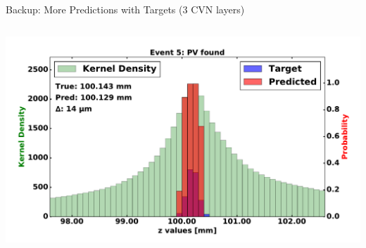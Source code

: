 \begin{frame}{Backup: More Predictions with Targets (3 CVN layers)}
\begin{columns}[c]
\begin{center}
           \includegraphics[width=1\textwidth, height=0.45\textwidth, trim=18 0 18 0]{images/120000_3layer_31.pdf}
       \end{center}
  \end{columns}
\end{frame}

